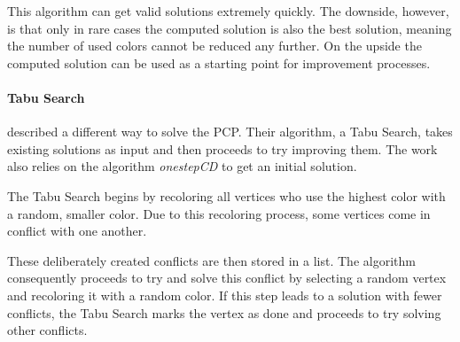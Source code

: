 \documentclass[paper=a4,fontsize=12pt]{scrartcl}
\begin{document}
This algorithm can get valid solutions extremely quickly. The downside, however, is that only in rare cases the computed solution is also the best solution, meaning the number of used colors cannot be reduced any further. On the upside the computed solution can be used as a starting point for improvement processes.

 
\paragraph{Tabu Search}{
\citet*{Noronha2006} described a different way to solve the PCP. Their algorithm, a Tabu Search, takes existing solutions as input and then proceeds to try improving them. The work also relies on the algorithm \emph{onestepCD} to get an initial solution.


The Tabu Search begins by recoloring all vertices who use the highest color with a random, smaller color. Due to this recoloring process, some vertices come in conflict with one another. 


These deliberately created conflicts are then stored in a list. The algorithm consequently proceeds to try and solve this conflict by selecting a random vertex and recoloring it with a random color. If this step leads to a solution with fewer conflicts, the Tabu Search marks the vertex as done and proceeds to try solving other conflicts.


}
\end{document}
